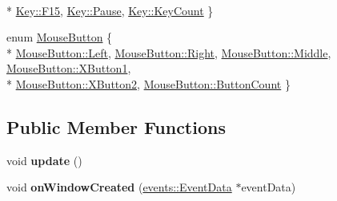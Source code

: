 \begin{DoxyCompactItemize}
\\*
\hyperlink{class_input_system_ad2fd19ae265c6309c2f91259b757e8b4ae53b55851b9ff4979f2c3ff434a4a138}{Key\+::\+F15}, 
\hyperlink{class_input_system_ad2fd19ae265c6309c2f91259b757e8b4a105b296a83f9c105355403f3332af50f}{Key\+::\+Pause}, 
\hyperlink{class_input_system_ad2fd19ae265c6309c2f91259b757e8b4a6edea92c9085d3d9c713f9dc76e2a61f}{Key\+::\+Key\+Count}
 \}
\item 
enum \hyperlink{class_input_system_a15198fc75c6a495ef51eccbf1f8882f5}{Mouse\+Button} \{ \\*
\hyperlink{class_input_system_a15198fc75c6a495ef51eccbf1f8882f5a945d5e233cf7d6240f6b783b36a374ff}{Mouse\+Button\+::\+Left}, 
\hyperlink{class_input_system_a15198fc75c6a495ef51eccbf1f8882f5a92b09c7c48c520c3c55e497875da437c}{Mouse\+Button\+::\+Right}, 
\hyperlink{class_input_system_a15198fc75c6a495ef51eccbf1f8882f5ab1ca34f82e83c52b010f86955f264e05}{Mouse\+Button\+::\+Middle}, 
\hyperlink{class_input_system_a15198fc75c6a495ef51eccbf1f8882f5aac8e5aa1a680bd64e6fb9313db5b4428}{Mouse\+Button\+::\+X\+Button1}, 
\\*
\hyperlink{class_input_system_a15198fc75c6a495ef51eccbf1f8882f5a7af9d9a16f813c045a3dbe8068a13f4d}{Mouse\+Button\+::\+X\+Button2}, 
\hyperlink{class_input_system_a15198fc75c6a495ef51eccbf1f8882f5a51213e6734b3713d4b827a8be2358090}{Mouse\+Button\+::\+Button\+Count}
 \}
\end{DoxyCompactItemize}
\subsection*{Public Member Functions}
\begin{DoxyCompactItemize}
\item 
\hypertarget{class_input_system_aeb2d30a71d7dc462258febd00ea77ea3}{}void {\bfseries update} ()\label{class_input_system_aeb2d30a71d7dc462258febd00ea77ea3}

\item 
\hypertarget{class_input_system_a4bdef610e376a3baebf3a632b3ce96fb}{}void {\bfseries on\+Window\+Created} (\hyperlink{structevents_1_1_event_data}{events\+::\+Event\+Data} $\ast$event\+Data)\label{class_input_system_a4bdef610e376a3baebf3a632b3ce96fb}

\end{DoxyCompactItemize}
